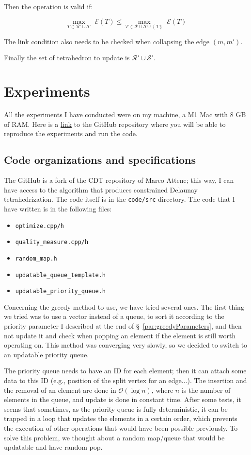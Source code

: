 \documentclass[11pt]{article}
\begin{document}
Then the operation is valid if:

$$\underset{T\in\mathcal{R}'\cup\mathcal{S}'}{\max}\;\mathcal{E}(T)\leq\underset{T\in\mathcal{R}\cup\mathcal{S}\cup\left\{T\right\}}{\max}\;\mathcal{E}(T)$$

The link condition also needs to be checked when collapsing the edge $(m,m')$.

Finally the set of tetrahedron to update is $\mathcal{R}'\cup\mathcal{S}'$.



\section{Experiments}

All the experiments I have conducted were on my machine, a M1 Mac with 8 GB of RAM. Here is a \href{https://github.com/bougimax/internship_genova}{link} to the GitHub repository where you will be able to reproduce the experiments and run the code.

\subsection{Code organizations and specifications}

The GitHub is a fork of the CDT repository of Marco Attene; this way, I can have access to the algorithm that produces constrained Delaunay tetrahedrization. The code itself is in the \texttt{code/src} directory. The code that I have written is in the following files:
\begin{itemize}
	\item \texttt{optimize.cpp/h}
	\item \texttt{quality\_measure.cpp/h}
	\item \texttt{random\_map.h}
	\item \texttt{updatable\_queue\_template.h}
	\item \texttt{updatable\_priority\_queue.h}
\end{itemize}

Concerning the greedy method to use, we have tried several ones. The first thing we tried was to use a vector instead of a queue, to sort it according to the priority parameter I described at the end of §~\ref{par:greedyParameters}, and then not update it and check when popping an element if the element is still worth operating on. This method was converging very slowly, so we decided to switch to an updatable priority queue.

The priority queue needs to have an ID for each element; then it can attach some data to this ID (e.g., position of the split vertex for an edge...). The insertion and the removal of an element are done in $\mathcal{O}(\log n)$, where $n$ is the number of elements in the queue, and update is done in constant time. After some tests, it seems that sometimes, as the priority queue is fully deterministic, it can be trapped in a loop that updates the elements in a certain order, which prevents the execution of other operations that would have been possible previously. To solve this problem, we thought about a random map/queue that would be updatable and have random pop.
\end{document}
